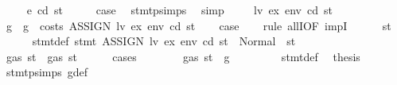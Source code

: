 \begin{isabellebody}
\ \ \isamarkupfalse%
\ {\isacharparenleft}{\kern0pt}{}\ e\ cd\ st{\isacharparenright}{\kern0pt}\isanewline
\ \ \isamarkupfalse%
\ \isamarkupfalse%
\ {\isacharquery}{\kern0pt}case\ \isamarkupfalse%
\ stmt{\isachardot}{\kern0pt}psimps{\isacharparenleft}{\kern0pt}{}{\isacharparenright}{\kern0pt}\ \isamarkupfalse%
\ simp\isanewline
{}\isamarkupfalse%
\isanewline
\ \ \isamarkupfalse%
\ {\isacharparenleft}{\kern0pt}{}\ lv\ ex\ env\ cd\ st{\isacharparenright}{\kern0pt}\isanewline
\ \ \isamarkupfalse%
\ g\ \ {\isachardoublequoteopen}g\ {\isacharequal}{\kern0pt}\ costs\ {\isacharparenleft}{\kern0pt}ASSIGN\ lv\ ex{\isacharparenright}{\kern0pt}\ env\ cd\ st{\isachardoublequoteclose}\isanewline
\ \ \isamarkupfalse%
\ {\isacharquery}{\kern0pt}case\isanewline
\ \ \isamarkupfalse%
\ {\isacharparenleft}{\kern0pt}rule\ allI{\isacharbrackleft}{\kern0pt}OF\ impI{\isacharbrackright}{\kern0pt}{\isacharparenright}{\kern0pt}\isanewline
\ \ \ \ \isamarkupfalse%
\ st{}{\isacharprime}{\kern0pt}\isanewline
\ \ \ \ \isamarkupfalse%
\ stmt{\isacharunderscore}{\kern0pt}def{\isacharcolon}{\kern0pt}\ {\isachardoublequoteopen}stmt\ {\isacharparenleft}{\kern0pt}ASSIGN\ lv\ ex{\isacharparenright}{\kern0pt}\ env\ cd\ st\ {\isacharequal}{\kern0pt}\ Normal\ {\isacharparenleft}{\kern0pt}{\isacharparenleft}{\kern0pt}{\isacharparenright}{\kern0pt}{\isacharcomma}{\kern0pt}\ st{}{\isacharprime}{\kern0pt}{\isacharparenright}{\kern0pt}{\isachardoublequoteclose}\isanewline
\ \ \ \ \isamarkupfalse%
\ \isamarkupfalse%
\ {\isachardoublequoteopen}gas\ st{}{\isacharprime}{\kern0pt}\ {\isasymle}\ gas\ st{\isachardoublequoteclose}\isanewline
\ \ \ \ \isamarkupfalse%
\ cases\isanewline
\ \ \ \ \ \ \isamarkupfalse%
\ {\isachardoublequoteopen}gas\ st\ {\isasymle}\ g{\isachardoublequoteclose}\isanewline
\ \ \ \ \ \ \isamarkupfalse%
\ {}{\isacharparenleft}{\kern0pt}{}{\isacharparenright}{\kern0pt}\ stmt{\isacharunderscore}{\kern0pt}def\ \isamarkupfalse%
\ {\isacharquery}{\kern0pt}thesis\ \isamarkupfalse%
\ stmt{\isachardot}{\kern0pt}psimps{\isacharparenleft}{\kern0pt}{}{\isacharparenright}{\kern0pt}\ g{\isacharunderscore}{\kern0pt}def\ \isamarkupfalse%

\end{isabellebody}
